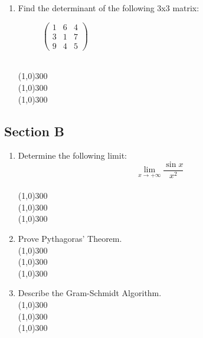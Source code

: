 \documentclass{article}
\begin{document}
\begin{enumerate}
\item Find the determinant of the following 3x3 matrix:
\begin{figure}[h!]%
\centering
\begin{math}
\begin{pmatrix}
1 & 6 & 4 \\
3 & 1 & 7 \\
9 & 4 & 5
\end{pmatrix}
\end{math}
\end{figure}
\\\line(1,0){300}
\\\line(1,0){300}
\\\line(1,0){300}

\end{enumerate}%

\subsection*{Section B}

\begin{enumerate}

\item Determine the following limit:
\begin{equation*}
\lim_{x \to +\infty} \frac{\sin{x}}{x^2}
\end{equation*}
\\\line(1,0){300}
\\\line(1,0){300}
\\\line(1,0){300}

\item Prove Pythagoras' Theorem.
\\\line(1,0){300}
\\\line(1,0){300}
\\\line(1,0){300}

\item Describe the Gram-Schmidt Algorithm.
\\\line(1,0){300}
\\\line(1,0){300}
\\\line(1,0){300}

\end{enumerate}
\end{document}
